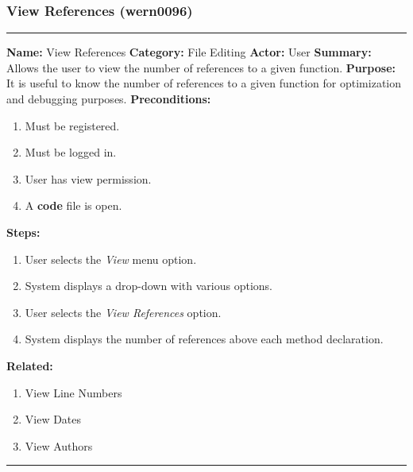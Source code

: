 \documentclass[11pt]{report}
\begin{document}
\subsubsection{View References (wern0096)}
\vspace{2pt}
\hrule
\vspace{8pt}
	\noindent\textbf{Name:} View References \newline
	\textbf{Category:} File Editing \newline
	\textbf{Actor:} User \newline
	\textbf{Summary:} Allows the user to view the number of references to a given function. \newline
	\textbf{Purpose:} It is useful to know the number of references to a given function for optimization and debugging purposes. \newline
	\textbf{Preconditions:}
	\begin{enumerate}
		\item Must be registered.
		\item Must be logged in.
		\item User has view permission.
		\item A \textbf{code} file is open.
	\end{enumerate}
	\textbf{Steps:}
	\begin{enumerate}
		\item User selects the \textit{View} menu option.
		\item System displays a drop-down with various options.
		\item User selects the \textit{View References} option.
		\item System displays the number of references above each method declaration.
	\end{enumerate}
	\textbf{Related:}
	\begin{enumerate}
		\item View Line Numbers
		\item View Dates
		\item View Authors
	\end{enumerate}
\vspace{8pt}
\hrule
\newpage
\end{document}
